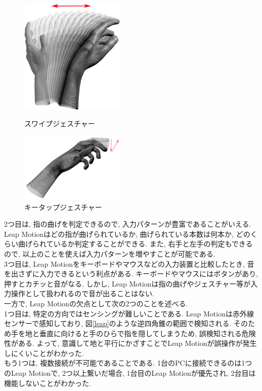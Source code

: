\documentclass{funthesis}
\begin{document}
\begin{figure}[H]
 \begin{minipage}{0.5\hsize}
  \begin{center}
  \includegraphics[width=50mm]{./img/Swipe.png}
  \end{center}
  \caption{スワイプジェスチャー}
  \label{swipe}
 \end{minipage}
 \begin{minipage}{0.5\hsize}
  \begin{center}
  \includegraphics[width=50mm]{./img/KeyTap.png}
  \end{center}
  \caption{キータップジェスチャー}
  \label{keytap}
 \end{minipage}
\end{figure}

 
  2つ目は, 指の曲げを判定できるので, 入力パターンが豊富であることがいえる. Leap Motionはどの指が曲げられているか, 曲げられている本数は何本か, どのくらい曲げられているか判定することができる. また, 右手と左手の判定もできるので, 以上のことを使えば入力パターンを増やすことが可能である. \\
  3つ目は, Leap Motionをキーボードやマウスなどの入力装置と比較したとき, 音を出さずに入力できるという利点がある. キーボードやマウスにはボタンがあり, 押すとカチッと音がなる. しかし, Leap Motionは指の曲げやジェスチャー等が入力操作として扱われるので音が出ることはない. \\
  一方で, Leap Motionの欠点として次の2つのことを述べる.\\
  1つ目は, 特定の方向ではセンシングが難しいことである. Leap Motionは赤外線センサーで感知しており,  図\ref{leap}のような逆四角錐の範囲で検知される. そのため手を地と垂直に向けると手のひらで指を隠してしまうため, 誤検知される危険性がある. よって, 意識して地と平行にかざすことでLeap Motionが誤操作が発生しにくいことがわかった.\\
  もう1つは, 複数接続が不可能であることである. 1台のPCに接続できるのは1つのLeap Motionで, 2つ以上繋いだ場合, 1台目のLeap Motionが優先され, 2台目は機能しないことがわかった.\\
 
\end{document}
